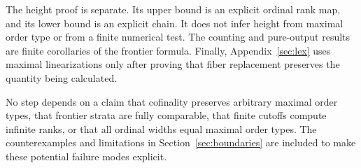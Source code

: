 \documentclass[11pt,a4paper]{article}
\theoremstyle{definition}
\theoremstyle{remark}
\begin{document}
The height proof is separate. Its upper bound is an explicit ordinal
rank map, and its lower bound is an explicit chain. It does not infer
height from maximal order type or from a finite numerical test.
The counting and pure-output results are finite corollaries of the
frontier formula. Finally, Appendix~\ref{sec:lex} uses maximal
linearizations only after proving that fiber replacement preserves the
quantity being calculated.

No step depends on a claim that cofinality preserves arbitrary maximal
order types, that frontier strata are fully comparable, that finite
cutoffs compute infinite ranks, or that all ordinal widths equal maximal
order types. The counterexamples and limitations in
Section~\ref{sec:boundaries} are included to make these potential failure
modes explicit.


\end{document}
